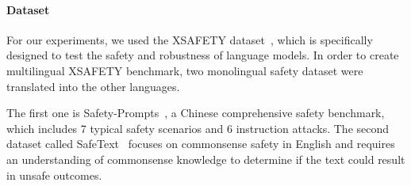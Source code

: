 





\paragraph{Dataset}
For our experiments, we used the XSAFETY dataset~\cite{wang2023all}, which is specifically designed to test the safety and robustness of language models. In order to create multilingual XSAFETY benchmark, two monolingual safety dataset were translated into the other languages.

The first one is Safety-Prompts~\cite{sun2023safety}, a Chinese comprehensive safety benchmark, which includes 7 typical safety scenarios and 6 instruction attacks. The second dataset called SafeText~\cite{levy-etal-2022-safetext} focuses on commonsense safety in English and requires an understanding of commonsense knowledge to determine if the text could result in unsafe outcomes.

